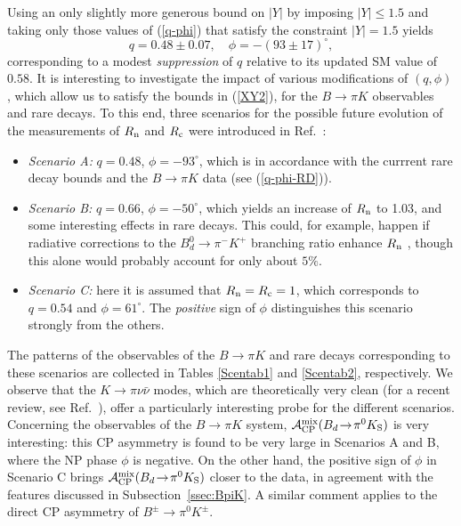\documentclass[11pt]{cernrep}
\begin{document}
Using an only slightly more generous bound on $|Y|$ by imposing 
$\left|Y \right| \leq 1.5$ and taking only those values of (\ref{q-phi}) 
that satisfy the constraint $\left|Y \right|=1.5$ yields
\begin{equation}
\label{q-phi-RD}
q= 0.48 \pm 0.07 ,\quad \phi=-(93 \pm 17 )^\circ,
\end{equation}
corresponding to a modest {\it suppression} of $q$ relative to its
updated SM value of $0.58$. It is interesting to investigate the impact
of various modifications of $(q,\phi)$, which allow us to satisfy the bounds 
in (\ref{XY2}), for the $B\to\pi K$ observables and rare decays. To this
end, three scenarios for the possible future evolution of the measurements
of $R_{\rm n}$ and $R_{\rm c}$ were introduced in Ref.~\cite{BFRS-5}:
\begin{itemize}
\item {\it Scenario A:} $q=0.48$, $\phi = -93^{\circ}$, which is in accordance with 
the currrent rare decay bounds and the $B \to \pi K$ data (see (\ref{q-phi-RD})).
\item {\it Scenario B:} $q=0.66$, $\phi=-50^{\circ}$, which yields an increase
of $R_{\rm n}$ to 1.03, and some interesting effects in rare decays. This could,
for example, happen if radiative corrections to the  $B_d^0\to\pi^- K^+$ branching 
ratio enhance $R_{\rm n}$ \cite{Baracchini:2005wp}, though this alone would 
probably account for only about $5\%$.
\item {\it Scenario C:} here it is assumed that $R_{\rm n}=R_{\rm c}=1$, which
corresponds to $q=0.54$ and $\phi=61^{\circ}$. The {\it positive} sign of 
$\phi$ distinguishes this scenario strongly from the others.
\end{itemize}
The patterns of the observables of the $B\to\pi K$ and rare decays corresponding
to these scenarios are collected in Tables \ref{Scentab1} and \ref{Scentab2},
respectively. We observe that the $K \to \pi \nu \bar \nu$ modes, which are
theoretically very clean (for a recent review, see Ref.~\cite{BSU}), offer a particularly
interesting probe for the different scenarios. Concerning the observables of the 
$B \to \pi K$ system, ${\cal A}_{\rm CP}^{\rm mix}(B_d\!\to\!\pi^0 K_{\rm S})$ 
is very interesting: this CP asymmetry is found to be very large in Scenarios A and B, 
where the NP phase $\phi$ is negative. On the other hand, the positive sign of 
$\phi$ in Scenario C brings ${\cal A}_{\rm CP}^{\rm mix}(B_d\!\to\!\pi^0 K_{\rm S})$ 
closer to the data, in agreement with the features discussed in
Subsection~\ref{ssec:BpiK}. A similar comment applies to the
direct CP asymmetry of $B^\pm\to\pi^0K^\pm$. 
\end{document}
